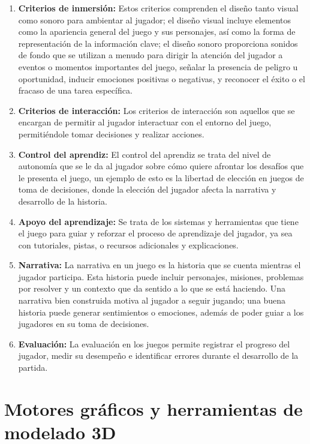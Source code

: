 \begin{enumerate}
  \item \textbf{Criterios de inmersión:} Estos criterios comprenden el diseño tanto visual como sonoro para ambientar al jugador; el diseño visual incluye elementos como la apariencia general del juego y sus personajes, así como la forma de representación de la información clave; el diseño sonoro proporciona sonidos de fondo que se utilizan a menudo para dirigir la atención del jugador a eventos o momentos importantes del juego, señalar la presencia de peligro u oportunidad, inducir emociones positivas o negativas, y reconocer el éxito o el fracaso de una tarea específica.
  \item \textbf{Criterios de interacción:} Los criterios de interacción son aquellos que se encargan de permitir al jugador interactuar con el entorno del juego, permitiéndole tomar decisiones y realizar acciones.
  \item \textbf{Control del aprendiz:} El control del aprendiz se trata del nivel de autonomía que se le da al jugador sobre cómo quiere afrontar los desafíos que le presenta el juego, un ejemplo de esto es la libertad de elección en juegos de toma de decisiones, donde la elección del jugador afecta la narrativa y desarrollo de la historia.
  \item \textbf{Apoyo del aprendizaje:} Se trata de los sistemas y herramientas que tiene el juego para guiar y reforzar el proceso de aprendizaje del jugador, ya sea con tutoriales, pistas, o recursos adicionales y explicaciones.
  \item \textbf{Narrativa:} La narrativa en un juego es la historia que se cuenta mientras el jugador participa. Esta historia puede incluir personajes, misiones, problemas por resolver y un contexto que da sentido a lo que se está haciendo. Una narrativa bien construida motiva al jugador a seguir jugando; una buena historia puede generar sentimientos o emociones, además de poder guiar a los jugadores en su toma de decisiones.
  \item \textbf{Evaluación:} La evaluación en los juegos permite registrar el progreso del jugador, medir su desempeño e identificar errores durante el desarrollo de la partida.
\end{enumerate}

\section{Motores gráficos y herramientas de modelado 3D}

